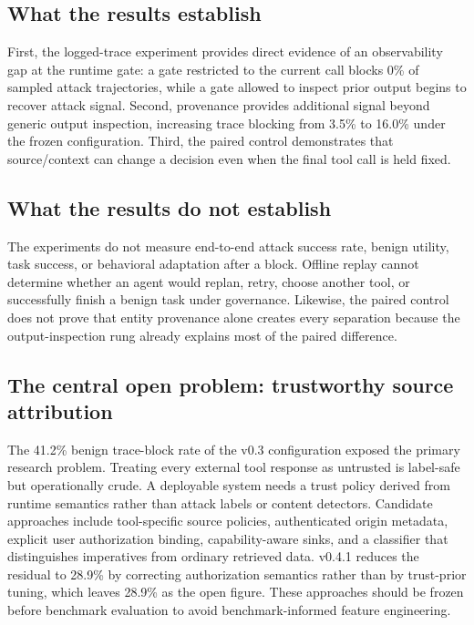 \documentclass[letterpaper,twocolumn,10pt]{article}
\begin{document}
\subsection{What the results establish}
\label{sec:disc:establish}

First, the logged-trace experiment provides direct evidence of an observability
gap at the runtime gate: a gate restricted to the current call blocks 0\% of
sampled attack trajectories, while a gate allowed to inspect prior output begins
to recover attack signal. Second, provenance provides additional signal beyond
generic output inspection, increasing trace blocking from 3.5\% to 16.0\% under
the frozen configuration. Third, the paired control demonstrates that
source/context can change a decision even when the final tool call is held
fixed.

\subsection{What the results do not establish}
\label{sec:disc:notestablish}

The experiments do not measure end-to-end attack success rate, benign utility,
task success, or behavioral adaptation after a block. Offline replay cannot
determine whether an agent would replan, retry, choose another tool, or
successfully finish a benign task under governance. Likewise, the paired control
does not prove that entity provenance alone creates every separation because the
output-inspection rung already explains most of the paired difference.

\subsection{The central open problem: trustworthy source attribution}
\label{sec:disc:trust}

The 41.2\% benign trace-block rate of the v0.3 configuration exposed the primary
research problem. Treating every external tool response as untrusted is
label-safe but operationally crude. A deployable system needs a trust policy
derived from runtime semantics rather than attack labels or content detectors.
Candidate approaches include tool-specific source policies, authenticated origin
metadata, explicit user authorization binding, capability-aware sinks, and a
classifier that distinguishes imperatives from ordinary retrieved data. v0.4.1
reduces the residual to 28.9\% by correcting authorization semantics rather than
by trust-prior tuning, which leaves 28.9\% as the open figure. These approaches
should be frozen before benchmark evaluation to avoid benchmark-informed feature
engineering.
\end{document}
